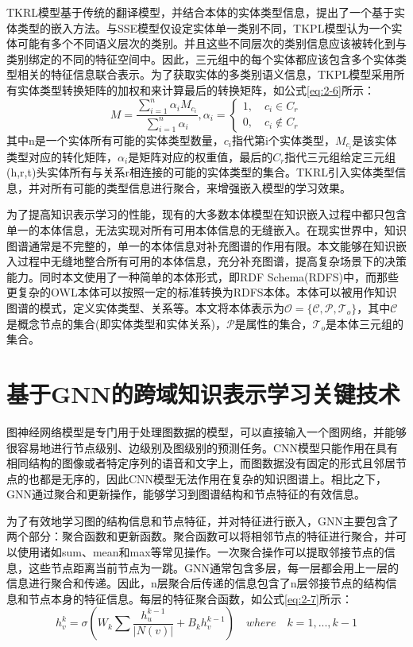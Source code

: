 TKRL\cite{xie2016representation-TKRL}模型基于传统的翻译模型，并结合本体的实体类型信息，提出了一个基于实体类型的嵌入方法。与SSE模型仅设定实体单一类别不同，TKPL模型认为一个实体可能有多个不同语义层次的类别。并且这些不同层次的类别信息应该被转化到与类别绑定的不同的特征空间中。因此，三元组中的每个实体都应该包含多个实体类型相关的特征信息联合表示。为了获取实体的多类别语义信息，TKPL模型采用所有实体类型转换矩阵的加权和来计算最后的转换矩阵，如公式\ref{eq:2-6}所示：
\begin{equation}
  M = \frac{\sum^{n}_{i = 1}\alpha_{i}M_{c_{i}}}{\sum^{n}_{i = 1}\alpha_{i}}, \alpha_{i} = \left \{\begin{array}{ll}
    1,\quad c_{i} \in C_{r}\\
    0,\quad c_{i} \notin C_{r}
    \end{array} 
    \right.\label{eq:2-6}
\end{equation}
其中n是一个实体所有可能的实体类型数量，\(c_{i}\)指代第i个实体类型，\(M_{c_{i}}\)是该实体类型对应的转化矩阵，\(\alpha_{i}\)是矩阵对应的权重值，最后的\(C_{r}\)指代三元组给定三元组(h,r,t)头实体所有与关系r相连接的可能的实体类型的集合。TKRL引入实体类型信息，并对所有可能的类型信息进行聚合，来增强嵌入模型的学习效果。

为了提高知识表示学习的性能，现有的大多数本体模型在知识嵌入过程中都只包含单一的本体信息，无法实现对所有可用本体信息的无缝嵌入。在现实世界中，知识图谱通常是不完整的，单一的本体信息对补充图谱的作用有限。本文能够在知识嵌入过程中无缝地整合所有可用的本体信息，充分补充图谱，提高复杂场景下的决策能力。同时本文使用了一种简单的本体形式，即RDF Schema(RDFS)中，而那些更复杂的OWL本体可以按照一定的标准转换为RDFS本体。本体可以被用作知识图谱的模式，定义实体类型、关系等。本文将本体表示为\(\mathcal{O} = \{\mathcal{C}, \mathcal{P},\mathcal{T}_{o}\}\)，其中\(\mathcal{C}\)是概念节点的集合(即实体类型和实体关系)，\(\mathcal{P}\)是属性的集合，\(\mathcal{T}_{o}\)是本体三元组的集合。

\section{基于GNN的跨域知识表示学习关键技术}
图神经网络模型是专门用于处理图数据的模型，可以直接输入一个图网络，并能够很容易地进行节点级别、边级别及图级别的预测任务。CNN模型只能作用在具有相同结构的图像或者特定序列的语音和文字上，而图数据没有固定的形式且邻居节点的也都是无序的，因此CNN模型无法作用在复杂的知识图谱上。相比之下，GNN通过聚合和更新操作，能够学习到图谱结构和节点特征的有效信息。

为了有效地学习图的结构信息和节点特征，并对特征进行嵌入，GNN主要包含了两个部分：聚合函数和更新函数。聚合函数可以将相邻节点的特征进行聚合，并可以使用诸如sum、mean和max等常见操作。一次聚合操作可以提取邻接节点的信息，这些节点距离当前节点为一跳。GNN通常包含多层，每一层都会用上一层的信息进行聚合和传递。因此，n层聚合后传递的信息包含了n层邻接节点的结构信息和节点本身的特征信息。每层的特征聚合函数，如公式\ref{eq:2-7}所示：
\begin{equation}
  h_{v}^{k} = \sigma(W_{k} \sum \frac{h_{u}^{k-1}}{|N(v)|} + B_{k}h_{v}^{k-1}) \quad where \quad k = 1, ..., k-1 \label{eq:2-7}
\end{equation}

